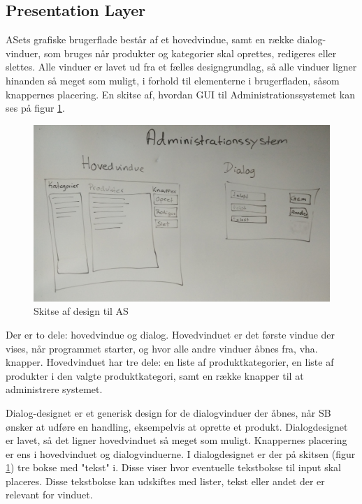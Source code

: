 \subsection{Presentation Layer}
\gls{AS}ets grafiske brugerflade består af et hovedvindue, samt en række dialog-vinduer, som bruges når produkter og kategorier skal oprettes, redigeres eller slettes. Alle vinduer er lavet ud fra et fælles designgrundlag, så alle vinduer ligner hinanden så meget som muligt, i forhold til elementerne i brugerfladen, såsom knappernes placering. En skitse af, hvordan \gls{GUI} til Administrationssystemet kan ses på figur \ref{fig:admin_design}.

\begin{figure}[H]
	\centering
	\includegraphics[width=1\textwidth]{Systemdesign/backend/Images/AdminDesign}
	\caption{Skitse af design til \gls{AS}}
	\label{fig:admin_design}
\end{figure}

Der er to dele: hovedvindue og dialog. Hovedvinduet er det første vindue der vises, når programmet starter, og hvor alle andre vinduer åbnes fra, vha. knapper. Hovedvinduet har tre dele: en liste af produktkategorier, en liste af produkter i den valgte produktkategori, samt en række knapper til at administrere systemet.

Dialog-designet er et generisk design for de dialogvinduer der åbnes, når \gls{SB} ønsker at udføre en handling, eksempelvis at oprette et produkt. Dialogdesignet er lavet, så det ligner hovedvinduet så meget som muligt. Knappernes placering er ens i hovedvinduet og dialogvinduerne. I dialogdesignet er der på skitsen (figur \ref{fig:admin_design}) tre bokse med "tekst" i. Disse viser hvor eventuelle tekstbokse til input skal placeres. Disse tekstbokse kan udskiftes med lister, tekst eller andet der er relevant for vinduet.\\

